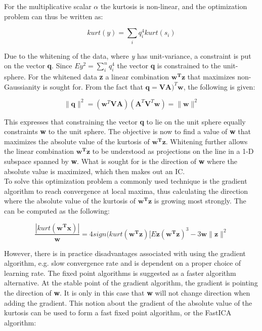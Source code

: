 For the multiplicative scalar \textit{$\alpha$} the kurtosis is non-linear, and the optimization problem can thus be written as:
			
\begin{equation}
kurt(y) = \sum_{i} q_{i}^{4}kurt(s_i)
\end{equation}
			
Due to the whitening of the data, where \textit{y} has unit-variance, a constraint is put on the vector \textbf{q}. Since $E{y^2} = \sum_{i}^{n} q_{i}^{4}$ the vector \textbf{q} is constrained to the unit-sphere. For the whitened data \textbf{z} a linear combination $\mathbf{w^T}\mathbf{z}$ that maximizes non-Gaussianity is sought for. From the fact that $\mathbf{q} = \mathbf{V}\mathbf{A})^{T}\mathbf{w}$, the following is given:
			
\begin{equation}
\parallel \mathbf{q} \parallel^{2}= (\mathbf{w}^{T}\mathbf{V}\mathbf{A})(\mathbf{A}^{T}\mathbf{V}^{T}\mathbf{w}) = \parallel \mathbf{w} \parallel^{2}
\end{equation}
			
This expresses that constraining the vector \textbf{q} to lie on the unit sphere equally constraints \textbf{w} to the unit sphere. The objective is now to find a value of \textbf{w} that maximizes the absolute value of the kurtosis of $\mathbf{w^T}\mathbf{z}$. Whitening further allows the linear combination $\mathbf{w^T}\mathbf{z}$ to be understood as projections on the line in a 1-D subspace spanned by \textbf{w}. What is sought for is the direction of \textbf{w} where the absolute value is maximized, which then makes out an IC. \\
To solve this optimization problem a commonly used technique is the gradient algorithm to reach convergence at local maxima, thus calculating the direction where the absolute value of the kurtosis of $\mathbf{w^T}\mathbf{z}$  is growing most strongly. The can be computed as the following:
			
\begin{equation}
\frac{|kurt(\mathbf{w^T}\mathbf{x})|}{\mathbf{w}} = 4sign(kurt(\mathbf{w^T}\mathbf{z})[E{\mathbf{z}(\mathbf{w^T}\mathbf{z})^{3} - 3\mathbf{w}\parallel\mathbf{z}\parallel ^{2}}
\end{equation}
				
However, there is in practice disadvantages associated with using the gradient algorithm, e.g. slow convergence rate and is dependent on a proper choice of learning rate. The fixed point algorithms is suggested as a faster algorithm alternative. At the stable point of the gradient algorithm, the gradient is pointing the direction of \textbf{w}. It is only in this case that \textbf{w} will not change direction when adding the gradient. This notion about the gradient of the absolute value of the kurtosis can be used to form a fast fixed point algorithm, or the FastICA algorithm:

